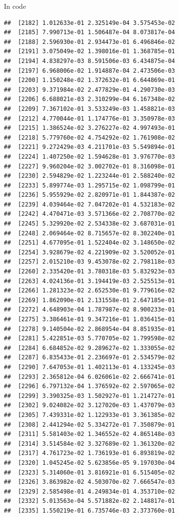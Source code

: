 \documentclass[ignorenonframetext,]{beamer}
\begin{document}
\begin{frame}[fragile]{In code}
\begin{verbatim}
##  [2182] 1.012633e-01 2.325149e-04 3.575453e-02
##  [2185] 7.990713e-01 1.506487e-04 8.073817e-04
##  [2188] 2.596930e-01 2.934473e-01 6.496846e-02
##  [2191] 3.075049e-02 1.398016e-01 1.368785e-01
##  [2194] 4.838297e-03 8.591506e-03 6.434875e-04
##  [2197] 6.968006e-02 1.914887e-04 2.473506e-03
##  [2200] 1.150248e-02 1.372632e-01 6.644869e-01
##  [2203] 9.371984e-02 2.477829e-01 4.290730e-03
##  [2206] 6.688021e-03 2.310299e-04 6.167348e-02
##  [2209] 7.367102e-01 3.533249e-03 1.458821e-03
##  [2212] 4.770044e-01 1.174776e-01 3.350978e-03
##  [2215] 1.386524e-02 3.276227e-02 4.997493e-01
##  [2218] 5.779760e-02 4.754292e-02 1.761908e-02
##  [2221] 9.272429e-03 4.211701e-03 5.549894e-01
##  [2224] 1.407250e-02 1.594628e-01 3.976770e-03
##  [2227] 9.960204e-02 3.002702e-01 8.316098e-01
##  [2230] 2.594829e-02 1.223244e-01 2.588240e-02
##  [2233] 5.899774e-03 1.295715e-02 1.098799e-01
##  [2236] 5.955929e-02 2.820971e-01 1.844387e-02
##  [2239] 4.039464e-02 7.047202e-01 4.532183e-02
##  [2242] 4.470471e-03 3.571366e-02 2.708770e-02
##  [2245] 5.329920e-02 2.534338e-02 3.687031e-01
##  [2248] 2.069464e-02 8.715657e-02 8.302240e-01
##  [2251] 4.677095e-01 1.522404e-02 3.148650e-02
##  [2254] 3.928679e-02 4.221909e-02 3.520052e-01
##  [2257] 2.015210e-03 9.453078e-02 2.798118e-03
##  [2260] 2.335420e-01 3.780318e-03 5.832923e-03
##  [2263] 4.024136e-01 3.194419e-03 2.525513e-01
##  [2266] 1.281323e-02 2.652530e-01 9.779616e-02
##  [2269] 1.862090e-01 2.131558e-01 2.647185e-01
##  [2272] 4.648903e-04 1.787987e-02 8.900233e-01
##  [2275] 3.386461e-01 9.347216e-01 1.036415e-01
##  [2278] 9.140504e-02 2.868954e-04 8.851935e-01
##  [2281] 5.422851e-03 5.770705e-02 1.799598e-02
##  [2284] 6.684852e-02 9.289627e-02 1.333055e-02
##  [2287] 6.835433e-01 2.236697e-01 2.534579e-02
##  [2290] 7.647053e-01 1.402113e-01 4.133245e-03
##  [2293] 2.365812e-04 6.026061e-02 2.666741e-01
##  [2296] 6.797132e-04 1.376592e-02 2.597065e-02
##  [2299] 3.390325e-03 1.502927e-01 1.214727e-01
##  [2302] 9.024082e-02 3.127020e-03 1.437079e-03
##  [2305] 7.439331e-02 1.122933e-01 3.361385e-02
##  [2308] 2.441294e-02 5.334272e-01 7.350879e-01
##  [2311] 5.581403e-02 1.346552e-02 4.865148e-03
##  [2314] 3.514584e-02 3.327689e-02 1.361320e-02
##  [2317] 4.761723e-02 1.736193e-01 6.893819e-02
##  [2320] 1.045245e-02 5.623856e-05 9.197030e-04
##  [2323] 5.314060e-01 3.816921e-01 6.515405e-02
##  [2326] 3.863982e-02 4.503070e-02 7.666547e-03
##  [2329] 2.585498e-01 4.249834e-01 4.353710e-02
##  [2332] 5.013563e-04 5.571882e-02 2.148817e-01
##  [2335] 1.550219e-01 6.735746e-03 2.373760e-01

\end{verbatim}
\end{frame}
\end{document}
